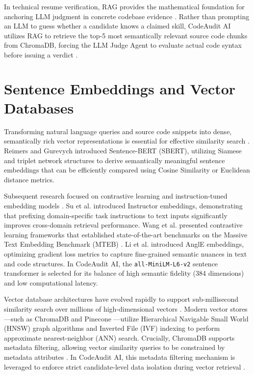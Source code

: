 In technical resume verification, RAG provides the mathematical foundation for anchoring LLM judgment in concrete codebase evidence \cite{ref31, ref33, ref32}. Rather than prompting an LLM to guess whether a candidate knows a claimed skill, CodeAudit AI utilizes RAG to retrieve the top-5 most semantically relevant source code chunks from ChromaDB, forcing the LLM Judge Agent to evaluate actual code syntax before issuing a verdict \cite{ref10, ref27, ref25, ref29}.

\section{Sentence Embeddings and Vector Databases}

Transforming natural language queries and source code snippets into dense, semantically rich vector representations is essential for effective similarity search \cite{ref70, ref41, ref49}. Reimers and Gurevych \cite{ref41} introduced Sentence-BERT (SBERT), utilizing Siamese and triplet network structures to derive semantically meaningful sentence embeddings that can be efficiently compared using Cosine Similarity or Euclidean distance metrics.

Subsequent research focused on contrastive learning and instruction-tuned embedding models \cite{ref71, ref48, ref49}. Su et al. \cite{ref48} introduced Instructor embeddings, demonstrating that prefixing domain-specific task instructions to text inputs significantly improves cross-domain retrieval performance. Wang et al. \cite{ref49} presented contrastive learning frameworks that established state-of-the-art benchmarks on the Massive Text Embedding Benchmark (MTEB) \cite{ref47}. Li et al. \cite{ref71} introduced AnglE embeddings, optimizing gradient loss metrics to capture fine-grained semantic nuances in text and code structures. In CodeAudit AI, the \texttt{all-MiniLM-L6-v2} sentence transformer \cite{ref41} is selected for its balance of high semantic fidelity (384 dimensions) and low computational latency.

Vector database architectures have evolved rapidly to support sub-millisecond similarity search over millions of high-dimensional vectors \cite{ref31, ref34}. Modern vector stores—such as ChromaDB \cite{ref31} and Pinecone \cite{ref34}—utilize Hierarchical Navigable Small World (HNSW) graph algorithms and Inverted File (IVF) indexing to perform approximate nearest-neighbor (ANN) search. Crucially, ChromaDB supports metadata filtering, allowing vector similarity queries to be constrained by metadata attributes \cite{ref31, ref33}. In CodeAudit AI, this metadata filtering mechanism is leveraged to enforce strict candidate-level data isolation during vector retrieval \cite{ref33, ref34}.

